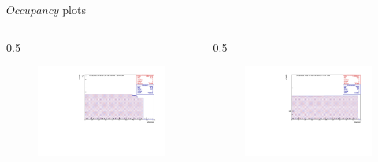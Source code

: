 \documentclass{beamer}
\begin{document}
\begin{frame}{$Occupancy$ plots}
\vspace{-4.4mm}
\begin{columns}
    \begin{column}{0.5 \framewidth}
    \begin{figure}[H]
          \centering
          \hspace*{-2em}
        \includegraphics[width=1.1\columnwidth]{figures/pdf/figure_00004_nhitsvschannel_roc_simulation_281.pdf}
          \label{fig:dfjkdsfh} 
\end{figure}    
    \end{column}
    \begin{column}{0.5 \framewidth}
           \begin{figure}[H]
          \centering
          \hspace*{-2em}
        \includegraphics[width=1.1\columnwidth]{figures/pdf/figure_00002_nhitsvschannel_roc_simulation_2.pdf}

\end{figure}
\end{column}
\end{columns}
\end{frame}
\end{document}
